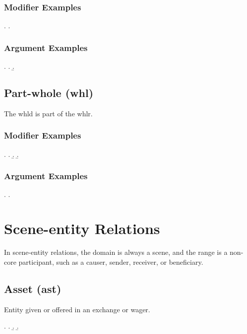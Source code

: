 \documentclass[a4paper]{article}
\begin{document}
\subsubsection{Modifier Examples}

\ex.
\a. 

\subsubsection{Argument Examples}

\ex.
\a. 
\b. 

\clearpage
\subsection{Part-whole (\textsf{whl})}
\label{sec:whl}

The \textsf{whld} is part of the \textsf{whlr}.

\subsubsection{Modifier Examples}

\ex.
\a. 
\b. 
\b. 

\subsubsection{Argument Examples}

\ex.
\a. 

\clearpage
\section{Scene-entity Relations}

In scene-entity relations, the domain is always a scene, and the range is a
non-core participant, such as a causer, sender, receiver, or beneficiary.

\subsection{Asset (\textsf{ast})}
\label{sec:ast}

Entity given or offered in an exchange or wager.

\ex.
\a. 
\b. 
\b. 
\end{document}
